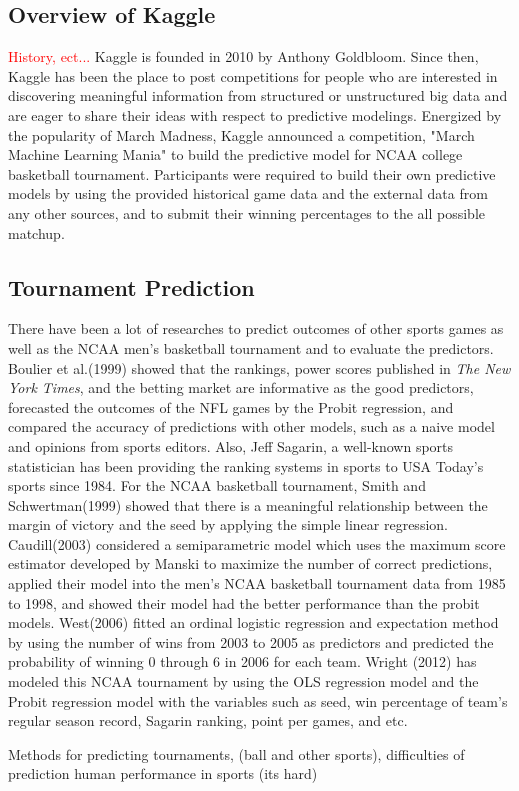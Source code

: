 \subsection{Overview of Kaggle}
\textcolor{red}{History, ect...}    
Kaggle is founded in 2010 by Anthony Goldbloom. Since then, Kaggle has been the place to post competitions for people who are interested in discovering meaningful information from structured or unstructured big data and are eager to share their ideas with respect to predictive modelings. Energized by the popularity of March Madness, Kaggle announced a competition, "March Machine Learning Mania" to build the predictive model for NCAA college basketball tournament. Participants were required to build their own predictive models by using the provided historical game data and the external data from any other sources, and to submit their winning percentages to the all possible matchup.

\subsection{Tournament Prediction}
There have been a lot of researches to predict outcomes of other sports games as well as the NCAA men's basketball tournament and to evaluate the predictors. Boulier et al.(1999) showed that the rankings, power scores published in \emph{The New York Times}, and the betting market are informative as the good predictors, forecasted the outcomes of the NFL games by the Probit regression, and compared the accuracy of predictions with other models, such as a naive model and opinions from sports editors. Also, Jeff Sagarin, a well-known sports statistician has been providing the ranking systems in sports to USA Today's sports since 1984. For the NCAA basketball tournament, Smith and Schwertman(1999) showed that there is a meaningful relationship between the margin of victory and the seed by applying the simple linear regression. Caudill(2003) considered a semiparametric model which uses the maximum score estimator developed by Manski to maximize the number of correct predictions, applied their model into the men's NCAA basketball tournament data from 1985 to 1998, and showed their model had the better performance than the probit models. West(2006) fitted an ordinal logistic regression and expectation method by using the number of wins from 2003 to 2005 as predictors and predicted the probability of winning 0 through 6 in 2006 for each team. Wright (2012) has modeled this NCAA tournament by using the OLS regression model and the Probit regression model with the variables such as seed, win percentage of team's regular season record, Sagarin ranking, point per games, and etc. 
 

Methods for predicting tournaments, (ball and other sports), difficulties of prediction human performance in sports (its hard)
